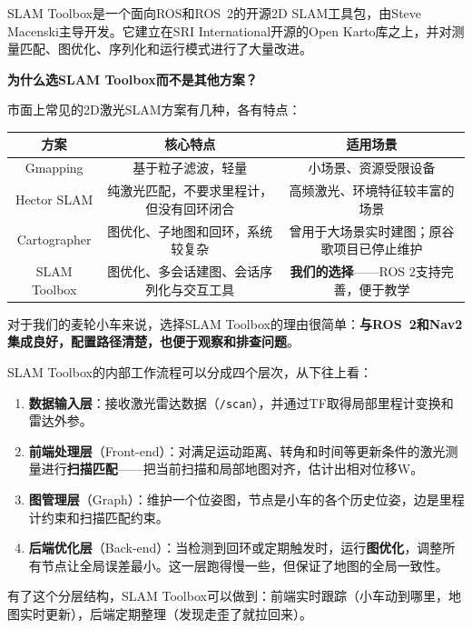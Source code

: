 \documentclass[UTF8,zihao=-4]{ctexart}
\DeclareRobustCommand{\code}[1]{\texttt{#1}}
\begin{document}
SLAM Toolbox是一个面向ROS和ROS~2的开源2D SLAM工具包，由Steve Macenski主导开发。它建立在SRI International开源的Open Karto库之上，并对测量匹配、图优化、序列化和运行模式进行了大量改进\cite{macenski2021slamtoolbox}。

\textbf{为什么选SLAM Toolbox而不是其他方案？}

市面上常见的2D激光SLAM方案有几种，各有特点：

\begin{table}[h]
\centering
\begin{tabular}{|c|c|c|}
\hline
\textbf{方案} & \textbf{核心特点} & \textbf{适用场景} \\
\hline
Gmapping & 基于粒子滤波，轻量 & 小场景、资源受限设备 \\
\hline
Hector SLAM & 纯激光匹配，不要求里程计，但没有回环闭合 & 高频激光、环境特征较丰富的场景 \\
\hline
Cartographer & 图优化、子地图和回环，系统较复杂 & 曾用于大场景实时建图；原谷歌项目已停止维护 \\
\hline
SLAM Toolbox & 图优化、多会话建图、会话序列化与交互工具 & \textbf{我们的选择}——ROS 2支持完善，便于教学 \\
\hline
\end{tabular}
\end{table}

对于我们的麦轮小车来说，选择SLAM Toolbox的理由很简单：\textbf{与ROS~2和Nav2集成良好，配置路径清楚，也便于观察和排查问题}。

SLAM Toolbox的内部工作流程可以分成四个层次，从下往上看：

\begin{enumerate}
\item \textbf{数据输入层}：接收激光雷达数据（\code{/scan}），并通过TF取得局部里程计变换和雷达外参。
\item \textbf{前端处理层}（Front-end）：对满足运动距离、转角和时间等更新条件的激光测量进行\textbf{扫描匹配}——把当前扫描和局部地图对齐，估计出相对位移W。
\item \textbf{图管理层}（Graph）：维护一个位姿图，节点是小车的各个历史位姿，边是里程计约束和扫描匹配约束。
\item \textbf{后端优化层}（Back-end）：当检测到回环或定期触发时，运行\textbf{图优化}，调整所有节点让全局误差最小。这一层跑得慢一些，但保证了地图的全局一致性。
\end{enumerate}

有了这个分层结构，SLAM Toolbox可以做到：前端实时跟踪（小车动到哪里，地图实时更新），后端定期整理（发现走歪了就拉回来）。
\end{document}

